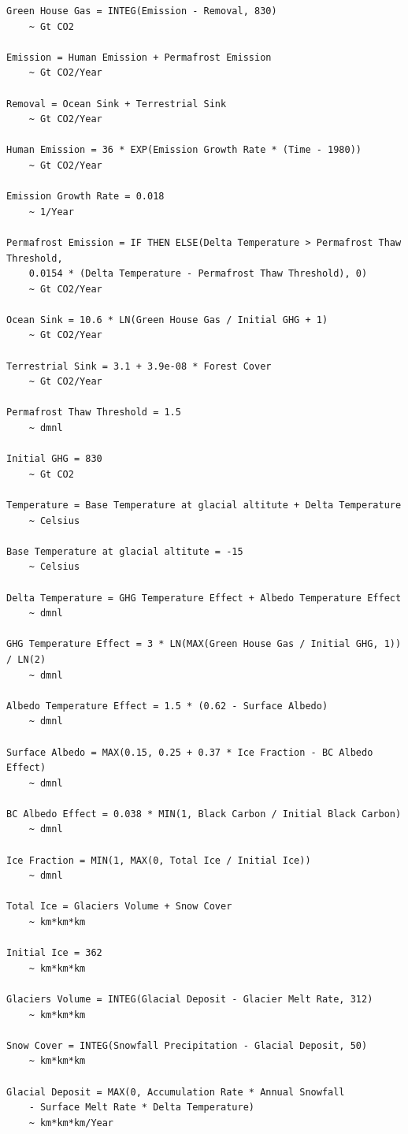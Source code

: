 \documentclass[12pt, a4paper]{article}
\begin{document}
\begin{verbatim}
Green House Gas = INTEG(Emission - Removal, 830)
    ~ Gt CO2

Emission = Human Emission + Permafrost Emission
    ~ Gt CO2/Year

Removal = Ocean Sink + Terrestrial Sink
    ~ Gt CO2/Year

Human Emission = 36 * EXP(Emission Growth Rate * (Time - 1980))
    ~ Gt CO2/Year

Emission Growth Rate = 0.018
    ~ 1/Year

Permafrost Emission = IF THEN ELSE(Delta Temperature > Permafrost Thaw Threshold,
    0.0154 * (Delta Temperature - Permafrost Thaw Threshold), 0)
    ~ Gt CO2/Year

Ocean Sink = 10.6 * LN(Green House Gas / Initial GHG + 1)
    ~ Gt CO2/Year

Terrestrial Sink = 3.1 + 3.9e-08 * Forest Cover
    ~ Gt CO2/Year

Permafrost Thaw Threshold = 1.5
    ~ dmnl

Initial GHG = 830
    ~ Gt CO2

Temperature = Base Temperature at glacial altitute + Delta Temperature
    ~ Celsius

Base Temperature at glacial altitute = -15
    ~ Celsius

Delta Temperature = GHG Temperature Effect + Albedo Temperature Effect
    ~ dmnl

GHG Temperature Effect = 3 * LN(MAX(Green House Gas / Initial GHG, 1)) / LN(2)
    ~ dmnl

Albedo Temperature Effect = 1.5 * (0.62 - Surface Albedo)
    ~ dmnl

Surface Albedo = MAX(0.15, 0.25 + 0.37 * Ice Fraction - BC Albedo Effect)
    ~ dmnl

BC Albedo Effect = 0.038 * MIN(1, Black Carbon / Initial Black Carbon)
    ~ dmnl

Ice Fraction = MIN(1, MAX(0, Total Ice / Initial Ice))
    ~ dmnl

Total Ice = Glaciers Volume + Snow Cover
    ~ km*km*km

Initial Ice = 362
    ~ km*km*km

Glaciers Volume = INTEG(Glacial Deposit - Glacier Melt Rate, 312)
    ~ km*km*km

Snow Cover = INTEG(Snowfall Precipitation - Glacial Deposit, 50)
    ~ km*km*km

Glacial Deposit = MAX(0, Accumulation Rate * Annual Snowfall
    - Surface Melt Rate * Delta Temperature)
    ~ km*km*km/Year


\end{verbatim}
\end{document}
